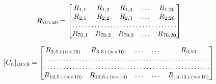 \documentclass[12pt]{article}
\begin{document}
\[
R_{70 \times 20 }
=
\begin{bmatrix}
    R_{1,1}       & R_{1,2} & R_{1,3} & \dots & R_{1,20} \\
    R_{2,1}       & R_{2,2} & R_{2,3} & \dots & R_{2,20} \\
    \hdotsfor{5} \\
    R_{70,1}       & R_{70,2} & R_{70,3} & \dots & R_{70,20}
\end{bmatrix}
\]

\[
[C_{n}]_{10 \times 8}
=
\begin{bmatrix}
    R_{3,5+(n \times 10)} & R_{3,6+(n \times 10)} & \dots & \dots & R_{3,13} \\
    \hdotsfor{5} \\
    \hdotsfor{5} \\
    R_{13,5+(n \times 10)} & R_{13,6+(n \times 10)} & \dots & \dots & R_{13,13+(n \times 10)}
\end{bmatrix}
\]
\end{document}
